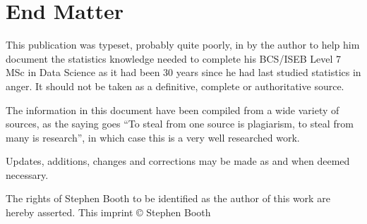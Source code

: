 \part{End Matter} \label{End Matter}

This publication was typeset, probably quite poorly, in \LaTeXe by the author to help him document the statistics knowledge needed to complete his BCS/ISEB Level 7 MSc in Data Science as it had been 30 years since he had last studied statistics in anger.  It should not be taken as a definitive, complete or authoritative source.

The information in this document have been compiled from a wide variety of sources, as the saying goes ``To steal from one source is plagiarism, to steal from many is research'', in which case this is a very well researched work.  

Updates, additions, changes and corrections may be made as and when deemed necessary.

The rights of Stephen Booth to be identified as the author of this work are hereby asserted. This imprint \copyright {\the\year}  Stephen Booth
